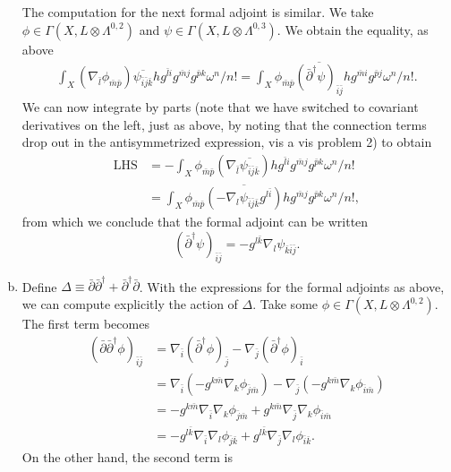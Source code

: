 \documentclass{../mathnotes}
\begin{document}
\begin{enumerate}[(a)]
        The computation for the next formal adjoint is similar. We take $\phi\in\Gamma(X,L\otimes\Lambda^{0,2})$ and
        $\psi\in\Gamma(X,L\otimes \Lambda^{0,3})$. We obtain the equality, as above
        \begin{align*}
            \int_X(\nabla_{\bar l}\phi_{\bar m\bar p})\overline{\psi_{\bar i\bar j\bar k}}hg^{\bar li}g^{\bar mj}g^{\bar pk}\omega^n/n!
            =\int_X\phi_{\bar m\bar p}\overline{(\bar\partial^\dagger\psi)_{\bar i\bar j}}hg^{\bar mi}g^{\bar pj}\omega^n/n!.
        \end{align*}
        We can now integrate by parts (note that we have switched to covariant derivatives on the left, just as above, by noting
        that the connection terms drop out in the antisymmetrized expression, vis a vis problem 2) to obtain
        \begin{align*}
            \text{LHS}&=-\int_X \phi_{\bar m\bar p}(\nabla_{\bar l}\overline{\psi_{\bar i\bar j\bar k}})hg^{\bar li}g^{\bar mj}g^{\bar pk}\omega^n/n!\\
            &=\int_X \phi_{\bar m\bar p}\overline{(-\nabla_l\psi_{\bar i\bar j\bar k}g^{l\bar i})}hg^{\bar mj}g^{\bar pk}\omega^n/n!,
        \end{align*}
        from which we conclude that the formal adjoint can be written
        \[(\bar\partial^\dagger\psi)_{\bar i\bar j}=-g^{l\bar k}\nabla_l\psi_{\bar k\bar i\bar j}.\]
    \item Define $\Delta\equiv\bar\partial\bar\partial^\dagger+\bar\partial^\dagger\bar\partial$. With the expressions
        for the formal adjoints as above, we can compute explicitly the action of $\Delta$. Take some $\phi\in\Gamma(X,L\otimes\Lambda^{0,2})$.
        The first term becomes
        \begin{align*}
            \left( \bar\partial\bar\partial^{\dagger}\phi \right)_{\bar i\bar j}&=\nabla_{\bar i}(\bar\partial^\dagger\phi)_{\bar j}-\nabla_{\bar j}(\bar\partial^\dagger\phi)_{\bar i}\\
            &=\nabla_{\bar i}(-g^{k\bar m}\nabla_k\phi_{\bar j\bar m})-\nabla_{\bar j}(-g^{k\bar m}\nabla_k\phi_{\bar i\bar m})\\
            &=-g^{k\bar m}\nabla_{\bar i}\nabla_{k}\phi_{\bar j\bar m}+g^{k\bar m}\nabla_{\bar j}\nabla_k\phi_{\bar i\bar m}\\
            &=-g^{l\bar k}\nabla_{\bar i}\nabla_{l}\phi_{\bar j\bar k}+g^{l\bar k}\nabla_{\bar j}\nabla_l\phi_{\bar i\bar k}.
        \end{align*}
        On the other hand, the second term is

\end{enumerate}
\end{document}
